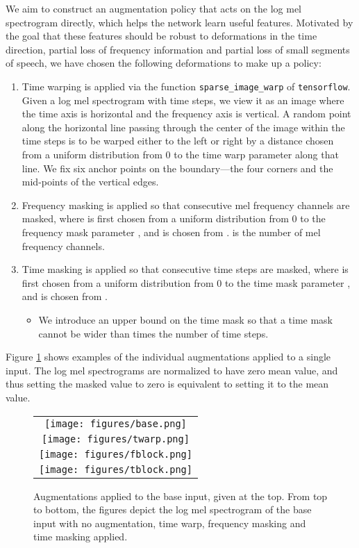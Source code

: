 \documentclass[a4paper]{article}
\begin{document}
We aim to construct an augmentation policy that acts on the log mel spectrogram directly, which helps the network learn useful features. Motivated by the goal that these features should be robust to deformations in the time direction, partial loss of frequency information and partial loss of small segments of speech, we have chosen the following deformations to make up a policy:
\begin{enumerate}
\item Time warping is applied via the function {\tt sparse\_image\_warp} of {\tt tensorflow}. Given a log mel spectrogram with  time steps, we view it as an image where the time axis is horizontal and the frequency axis is vertical. A random point along the horizontal line passing through the center of the image within the time steps  is to be warped either to the left or right by a distance  chosen from a uniform distribution from 0 to the time warp parameter  along that line.  We fix six anchor points on the boundary---the four corners and the mid-points of the vertical edges.
\item Frequency masking is applied so that  consecutive mel frequency channels  are masked, where  is first chosen from a uniform distribution from 0 to the frequency mask parameter , and  is chosen from .  is the number of mel frequency channels.
\item Time masking is applied so that  consecutive time steps  are masked, where  is first chosen from a uniform distribution from 0 to the time mask parameter , and  is chosen from .
 \begin{itemize}
 \item We introduce an upper bound on the time mask so that a time mask cannot be wider than  times the number of time steps.
 \end{itemize}
\end{enumerate}
Figure \ref{fig:augs} shows examples of the individual augmentations applied to a single input. The log mel spectrograms are normalized to have zero mean value, and thus setting the masked value to zero is equivalent to setting it to the mean value.

\begin{figure}[t]
  \centering
  \begin{tabular}{c}
  \texttt{[image: figures/base.png]} \\
  \texttt{[image: figures/twarp.png]} \\
  \texttt{[image: figures/fblock.png]} \\
  \texttt{[image: figures/tblock.png]}
  \end{tabular}
  \vskip -0.1in
  \caption{Augmentations applied to the base input, given at the top. From top to bottom, the figures depict the log mel spectrogram of the base input with no augmentation, time warp, frequency masking and time masking applied.}
  \label{fig:augs}
\end{figure}
\end{document}
